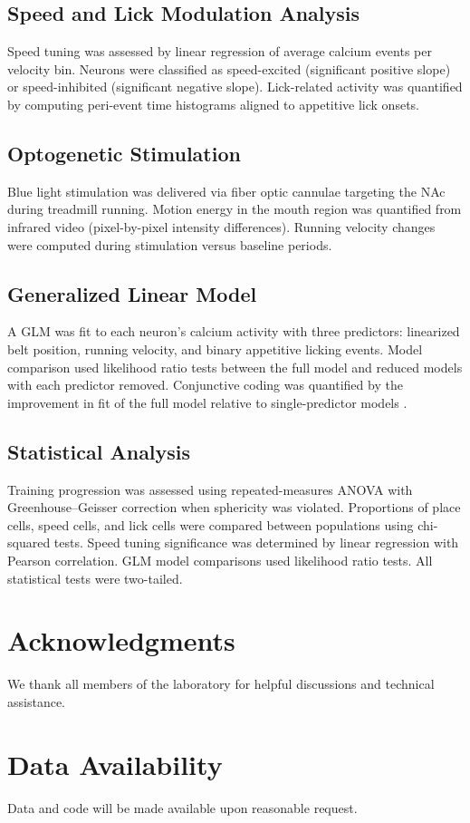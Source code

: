 \documentclass[11pt]{article}
\begin{document}
\subsection{Speed and Lick Modulation Analysis}

Speed tuning was assessed by linear regression of average calcium events per velocity bin. Neurons were classified as speed-excited (significant positive slope) or speed-inhibited (significant negative slope). Lick-related activity was quantified by computing peri-event time histograms aligned to appetitive lick onsets.

\subsection{Optogenetic Stimulation}

Blue light stimulation was delivered via fiber optic cannulae targeting the NAc during treadmill running. Motion energy in the mouth region was quantified from infrared video (pixel-by-pixel intensity differences). Running velocity changes were computed during stimulation versus baseline periods.

\subsection{Generalized Linear Model}

A GLM was fit to each neuron's calcium activity with three predictors: linearized belt position, running velocity, and binary appetitive licking events. Model comparison used likelihood ratio tests between the full model and reduced models with each predictor removed. Conjunctive coding was quantified by the improvement in fit of the full model relative to single-predictor models \citep{Hardcastle2017}.

\subsection{Statistical Analysis}

Training progression was assessed using repeated-measures ANOVA with Greenhouse--Geisser correction when sphericity was violated. Proportions of place cells, speed cells, and lick cells were compared between populations using chi-squared tests. Speed tuning significance was determined by linear regression with Pearson correlation. GLM model comparisons used likelihood ratio tests. All statistical tests were two-tailed.

\section*{Acknowledgments}
We thank all members of the laboratory for helpful discussions and technical assistance.

\section*{Data Availability}
Data and code will be made available upon reasonable request.



\end{document}
